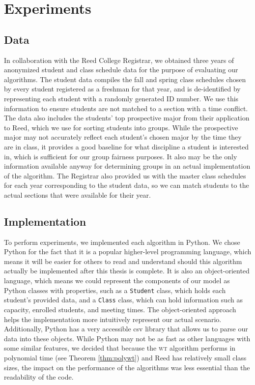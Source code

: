 \chapter{Experiments}
\section{Data}

In collaboration with the Reed College Registrar, we obtained three years of
anonymized student and class schedule data for the purpose of evaluating our
algorithms. The student data compiles the fall and spring class schedules chosen
by every student registered as a freshman for that year, and is de-identified by
representing each student with a randomly generated ID number. We use this
information to ensure students are not matched to a section with a time
conflict. The data also includes the students’ top prospective major from their
application to Reed, which we use for sorting students into groups. While the
prospective major may not accurately reflect each student’s chosen major by the
time they are in class, it provides a good baseline for what discipline a
student is interested in, which is sufficient for our group fairness purposes.
It also may be the only information available anyway for determining groups in
an actual implementation of the algorithm. 
The Registrar also provided us with the master class schedules for each year
corresponding to the student data, so we can match students to the actual
sections that were available for their year.

\section{Implementation}

To perform experiments, we implemented each algorithm in Python. We chose Python
for the fact that it is a popular higher-level programming language, which means
it will be easier for others to read and understand should this algorithm
actually be implemented after this thesis is complete. It is also an
object-oriented language, which means we could represent the components of our
model as Python classes with properties, such as a \texttt{Student} class, which holds each
student’s provided data,  and a \texttt{Class} class, which can hold information such as
capacity, enrolled students, and meeting times. The object-oriented approach
helps the implementation more intuitively represent our actual scenario.
Additionally, Python has a very accessible csv library that allows us to parse
our data into these objects. While Python may not be as fast as other languages
with some similar features, we decided that because the \textsc{wt} algorithm performs in
polynomial time (see Theorem \ref{thm:polywt}) and Reed has relatively small class sizes,
the impact on the performance of the algorithms was less essential than the
readability of the code.

